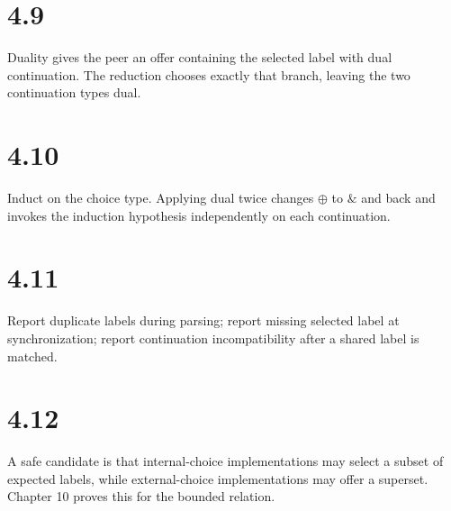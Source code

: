 \section*{4.9}
Duality gives the peer an offer containing the selected label with dual continuation. The reduction chooses exactly that branch, leaving the two continuation types dual.

\section*{4.10}
Induct on the choice type. Applying dual twice changes $\oplus$ to $\&$ and back and invokes the induction hypothesis independently on each continuation.

\section*{4.11}
Report duplicate labels during parsing; report missing selected label at synchronization; report continuation incompatibility after a shared label is matched.

\section*{4.12}
A safe candidate is that internal-choice implementations may select a subset of expected labels, while external-choice implementations may offer a superset. Chapter 10 proves this for the bounded relation.
